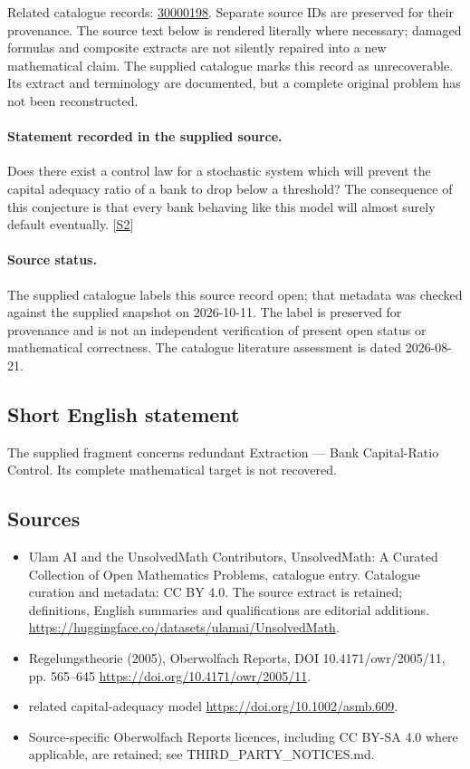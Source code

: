 \documentclass[11pt]{article}
\begin{document}
Related catalogue records: \href{https://mehmetmars7.github.io/Erdosproblems-llm-hunter/problem.html?type=open_problems&id=30000198}{30000198}. Separate source IDs are preserved for their provenance.
The source text below is rendered literally where necessary; damaged formulas and composite extracts are not silently repaired into a new mathematical claim.
The supplied catalogue marks this record as unrecoverable. Its extract and terminology are documented, but a complete original problem has not been reconstructed.
\paragraph{Statement recorded in the supplied source.}
Does there exist a control law for a stochastic system which will prevent the capital adequacy ratio of a bank to drop below a threshold? The consequence of this conjecture is that every bank behaving like this model will almost surely default eventually. \href{https://doi.org/10.4171/owr/2005/11}{[S2]}
\paragraph{Source status.}
The supplied catalogue labels this source record open; that metadata was checked against the supplied snapshot on 2026-10-11. The label is preserved for provenance and is not an independent verification of present open status or mathematical correctness. The catalogue literature assessment is dated 2026-08-21.
\subsection{Short English statement}
The supplied fragment concerns redundant Extraction — Bank Capital-Ratio Control. Its complete mathematical target is not recovered.
\subsection{Sources}
\begin{itemize}
\item[S1] Ulam AI and the UnsolvedMath Contributors, UnsolvedMath: A Curated Collection of Open Mathematics Problems, catalogue entry. Catalogue curation and metadata: CC BY 4.0. The source extract is retained; definitions, English summaries and qualifications are editorial additions.
\url{https://huggingface.co/datasets/ulamai/UnsolvedMath}.
\item[S2] Regelungstheorie (2005), Oberwolfach Reports, DOI 10.4171/owr/2005/11, pp. 565--645
\url{https://doi.org/10.4171/owr/2005/11}.
\item[S3] related capital-adequacy model
\url{https://doi.org/10.1002/asmb.609}.
\item Source-specific Oberwolfach Reports licences, including CC BY-SA 4.0 where applicable, are retained; see THIRD\_PARTY\_NOTICES.md.
\end{itemize}
\end{document}
